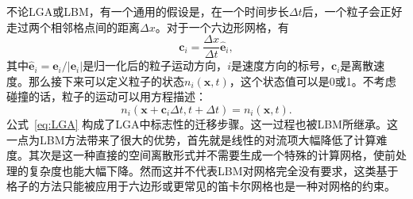 不论LGA或LBM，有一个通用的假设是，在一个时间步长$\Delta t$后，一个粒子会正好走过两个相邻格点间的距离$\Delta x$。对于一个六边形网格，有
\begin{equation}
    \mathbf{c}_i=\frac{\Delta x}{\Delta t}\hat{\mathbf{e}}_i,
\end{equation}
其中$\hat{\mathbf{e}}_i=\mathbf{e}_i/|\mathbf{e}_i|$是归一化后的粒子运动方向，$i$是速度方向的标号，$\mathbf{c}_i$是离散速度。那么接下来可以定义粒子的状态$n_{i}(\mathbf{x},t)$，这个状态值可以是0或1。不考虑碰撞的话，粒子的运动可以用方程描述：
\begin{equation}
    n_{i}(\mathbf{x}+\mathbf{c}_i \Delta t,t+\Delta t)=n_{i}(\mathbf{x},t).
    \label{eq:LGA}
\end{equation}
公式~\ref{eq:LGA} 构成了LGA中标志性的迁移步骤。这一过程也被LBM所继承。这一点为LBM方法带来了很大的优势，首先就是线性的对流项大幅降低了计算难度。其次是这一种直接的空间离散形式并不需要生成一个特殊的计算网格，使前处理的复杂度也能大幅下降。然而这并不代表LBM对网格完全没有要求，这类基于格子的方法只能被应用于六边形或更常见的笛卡尔网格也是一种对网格的约束。

